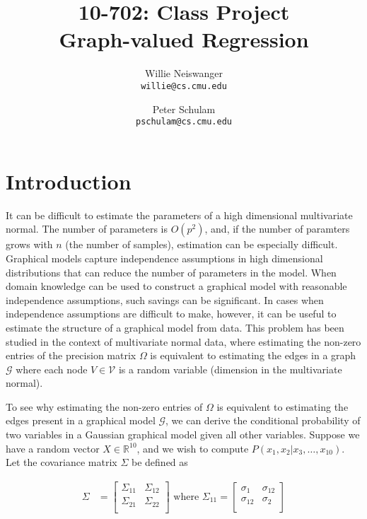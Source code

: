 \documentclass[12pt]{article}
\title{10-702: Class Project\\
Graph-valued Regression}
\author{Willie Neiswanger\\
\texttt{willie@cs.cmu.edu}
\and
Peter Schulam\\
\texttt{pschulam@cs.cmu.edu}}
\begin{document}
\maketitle

\section{Introduction}
\label{sec:introduction}

It can be difficult to estimate the parameters of a high dimensional
multivariate normal. The number of parameters is $O(p^2)$, and, if the
number of paramters grows with $n$ (the number of samples), estimation
can be especially difficult. Graphical models capture independence
assumptions in high dimensional distributions that can reduce the
number of parameters in the model. When domain knowledge can be used
to construct a graphical model with reasonable independence
assumptions, such savings can be significant. In cases when
independence assumptions are difficult to make, however, it can be
useful to estimate the structure of a graphical model from data. This
problem has been studied in the context of multivariate normal data,
where estimating the non-zero entries of the precision matrix $\Omega$
is equivalent to estimating the edges in a graph $\mathcal{G}$ where
each node $V \in \mathcal{V}$ is a random variable (dimension in the
multivariate normal).

To see why estimating the non-zero entries of $\Omega$ is equivalent
to estimating the edges present in a graphical model $\mathcal{G}$, we
can derive the conditional probability of two variables in a Gaussian
graphical model given all other variables. Suppose we have a random
vector $X \in \mathbb{R}^{10}$, and we wish to compute $P(x_1, x_2 |
x_3, \ldots, x_{10})$. Let the covariance matrix $\Sigma$ be defined
as

\begin{align}
    \Sigma &= \begin{bmatrix}
        \Sigma_{11} & \Sigma_{12} \\
        \Sigma_{21} & \Sigma_{22} \\
    \end{bmatrix}
    \text{ where }
    \Sigma_{11} = \begin{bmatrix}
        \sigma_{1} & \sigma_{12} \\
        \sigma_{12} & \sigma_{2} \\
    \end{bmatrix}
\end{align}
\end{document}

